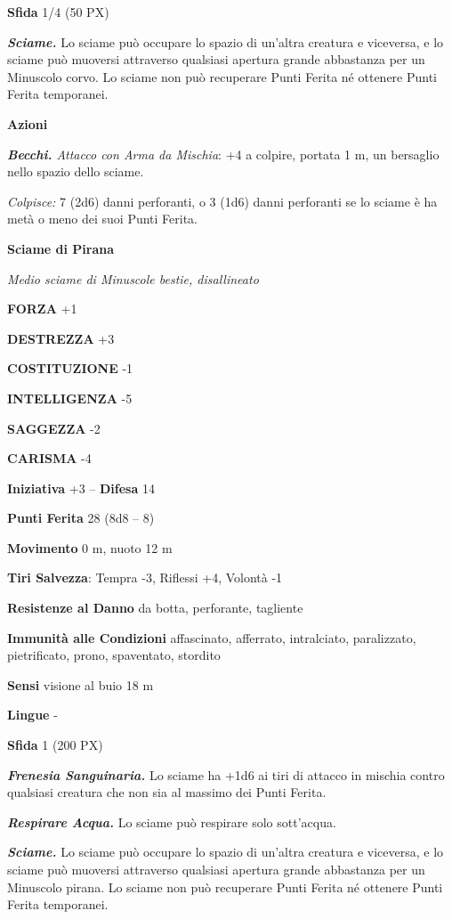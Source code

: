 \begin{multicols}{2}
	\textbf{Sfida} 1/4 (50 PX)

	\textit{\textbf{Sciame.}} Lo sciame può occupare lo spazio di un'altra creatura e viceversa, e lo sciame può muoversi attraverso qualsiasi apertura grande abbastanza per un Minuscolo corvo. Lo sciame non può recuperare Punti Ferita né ottenere Punti Ferita temporanei.

	\textbf{Azioni}

	\textit{\textbf{Becchi.} Attacco con Arma da Mischia}: +4 a colpire, portata 1 m, un bersaglio nello spazio dello sciame.

	\textit{Colpisce:} 7 (2d6) danni perforanti, o 3 (1d6) danni perforanti se lo sciame è ha metà o meno dei suoi Punti Ferita.

	\medskip\textbf{Sciame di Pirana}

	\textit{Medio sciame di Minuscole bestie, disallineato}

	\textbf{FORZA} +1

	\textbf{DESTREZZA} +3

	\textbf{COSTITUZIONE} -1

	\textbf{INTELLIGENZA} -5

	\textbf{SAGGEZZA} -2

	\textbf{CARISMA} -4

	\textbf{Iniziativa} +3 -- \textbf{Difesa} 14

	\textbf{Punti Ferita} 28 (8d8 -- 8)

	\textbf{Movimento} 0 m, nuoto 12 m

	\textbf{Tiri Salvezza}: Tempra -3, Riflessi +4, Volontà -1

	\textbf{Resistenze al Danno} da botta, perforante, tagliente

	\textbf{Immunità alle Condizioni} affascinato, afferrato, intralciato, paralizzato, pietrificato, prono, spaventato, stordito

	\textbf{Sensi} visione al buio 18 m

	\textbf{Lingue} -

	\textbf{Sfida} 1 (200 PX)

	\textit{\textbf{Frenesia Sanguinaria.}} Lo sciame ha +1d6 ai tiri di attacco in mischia contro qualsiasi creatura che non sia al massimo dei Punti Ferita.

	\textit{\textbf{Respirare Acqua.}} Lo sciame può respirare solo sott'acqua.

	\textit{\textbf{Sciame.}} Lo sciame può occupare lo spazio di un'altra creatura e viceversa, e lo sciame può muoversi attraverso qualsiasi apertura grande abbastanza per un Minuscolo pirana. Lo sciame non può recuperare Punti Ferita né ottenere Punti Ferita temporanei.


\end{multicols}
